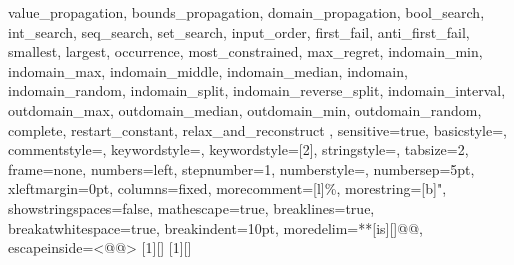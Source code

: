 {{  value_propagation, bounds_propagation, domain_propagation,
  bool_search, int_search, seq_search,
  set_search, input_order, first_fail, anti_first_fail, smallest,
  largest, occurrence, most_constrained, max_regret, indomain_min,
  indomain_max, indomain_middle, indomain_median, indomain,
  indomain_random, indomain_split, indomain_reverse_split,
  indomain_interval, outdomain_max, outdomain_median, outdomain_min,
  outdomain_random, complete, restart_constant, relax_and_reconstruct
  },
  sensitive=true,
  basicstyle=\mznfont,
  commentstyle=\color[rgb]{0.2,0.4,0.4},
  keywordstyle=\color[rgb]{0,0.5,0},
  keywordstyle=[2]\color{blue},
  stringstyle=\color{orange},
  tabsize=2,
  frame=none,
  numbers=left,
  stepnumber=1,
  numberstyle=\tiny,
  numbersep=5pt,
  xleftmargin=0pt, %
  columns=fixed, %
  morecomment=[l]{\%},
  morestring=[b]",
  showstringspaces=false,
  mathescape=true,
  breaklines=true,
  breakatwhitespace=true,
  breakindent=10pt, %
  moredelim=**[is][\color{Melon}]{@}{@},
  escapeinside={{<@}{@>}}
}
[1][]{\lstset{language=Mzn,#1}}{}
[1][]{\lstset{language=Mzn,numbers=none,xleftmargin=0pt,#1}}{}
\newcommand{\mzninline}[1]{\lstinline[{language=Mzn}]|#1|}
\newcommand{\mzninlinebar}[1]{\lstinline[{language=Mzn}]!#1!}
